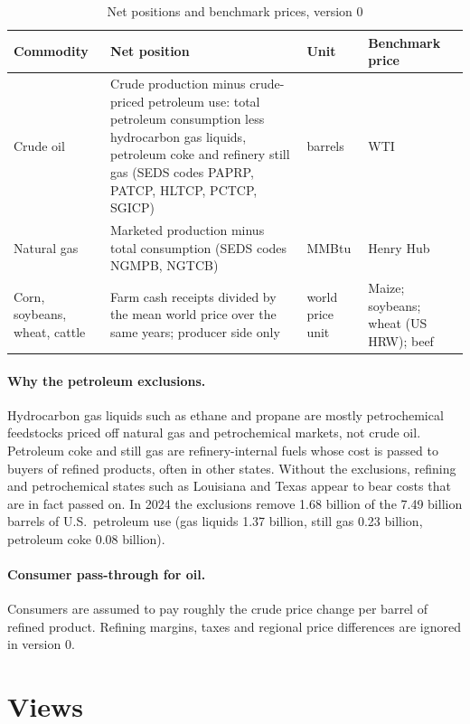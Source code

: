 \documentclass[11pt]{article}
\begin{document}
\begin{table}[ht]
\centering
\small
\caption{Net positions and benchmark prices, version 0}
\label{tab:positions}
\begin{tabularx}{\textwidth}{@{}>{\raggedright\arraybackslash}p{2.3cm} L
  >{\raggedright\arraybackslash}p{1.7cm} >{\raggedright\arraybackslash}p{2.5cm}@{}}
\toprule
Commodity & Net position & Unit & Benchmark price \\
\midrule
Crude oil & Crude production minus crude-priced petroleum use: total petroleum
  consumption less hydrocarbon gas liquids, petroleum coke and refinery still gas
  (SEDS codes PAPRP, PATCP, HLTCP, PCTCP, SGICP) & barrels & WTI \\
\addlinespace
Natural gas & Marketed production minus total consumption (SEDS codes NGMPB, NGTCB)
  & MMBtu & Henry Hub \\
\addlinespace
Corn, soybeans, wheat, cattle & Farm cash receipts divided by the mean world price over
  the same years; producer side only & world price unit & Maize; soybeans; wheat (US HRW);
  beef \\
\bottomrule
\end{tabularx}
\end{table}

\paragraph{Why the petroleum exclusions.} Hydrocarbon gas liquids such as ethane and
propane are mostly petrochemical feedstocks priced off natural gas and petrochemical
markets, not crude oil. Petroleum coke and still gas are refinery-internal fuels whose cost
is passed to buyers of refined products, often in other states. Without the exclusions,
refining and petrochemical states such as Louisiana and Texas appear to bear costs that are
in fact passed on. In 2024 the exclusions remove 1.68 billion of the 7.49 billion barrels of
U.S.\ petroleum use (gas liquids 1.37 billion, still gas 0.23 billion, petroleum coke 0.08
billion).

\paragraph{Consumer pass-through for oil.} Consumers are assumed to pay roughly the crude
price change per barrel of refined product. Refining margins, taxes and regional price
differences are ignored in version 0.

\section{Views}
\end{document}
